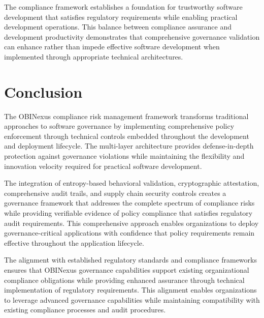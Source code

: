 The compliance framework establishes a foundation for trustworthy software development that satisfies regulatory requirements while enabling practical development operations. This balance between compliance assurance and development productivity demonstrates that comprehensive governance validation can enhance rather than impede effective software development when implemented through appropriate technical architectures.

\section*{Conclusion}

The OBINexus compliance risk management framework transforms traditional approaches to software governance by implementing comprehensive policy enforcement through technical controls embedded throughout the development and deployment lifecycle. The multi-layer architecture provides defense-in-depth protection against governance violations while maintaining the flexibility and innovation velocity required for practical software development.

The integration of entropy-based behavioral validation, cryptographic attestation, comprehensive audit trails, and supply chain security controls creates a governance framework that addresses the complete spectrum of compliance risks while providing verifiable evidence of policy compliance that satisfies regulatory audit requirements. This comprehensive approach enables organizations to deploy governance-critical applications with confidence that policy requirements remain effective throughout the application lifecycle.

The alignment with established regulatory standards and compliance frameworks ensures that OBINexus governance capabilities support existing organizational compliance obligations while providing enhanced assurance through technical implementation of regulatory requirements. This alignment enables organizations to leverage advanced governance capabilities while maintaining compatibility with existing compliance processes and audit procedures.